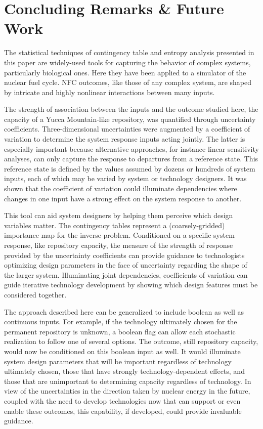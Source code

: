 \section{Concluding Remarks \& Future Work}
\label{cts_sec:conclusion}

The statistical techniques of contingency table and entropy analysis presented 
in this paper are widely-used tools for capturing the behavior of complex systems, 
particularly biological ones.  Here they have been applied to a simulator of the 
nuclear fuel cycle.  NFC outcomes, like those of any complex system, are shaped 
by intricate and highly nonlinear interactions between many inputs.

The strength of association between the inputs and the outcome studied here, the 
capacity of a Yucca Mountain-like repository, was quantified through uncertainty 
coefficients.  Three-dimensional uncertainties were augmented by a coefficient of 
variation to determine the system response inputs acting jointly.  The latter is 
especially important because alternative approaches, for instance linear sensitivity 
analyses, can only capture the response to departures from a reference state.  This 
reference state is defined by the values assumed by dozens or hundreds of system 
inputs, each of which may be varied by system or technology designers.  It was 
shown that the coefficient of variation could illuminate dependencies where changes 
in one input have a strong effect on the system response to another.  

This tool can aid system designers by helping them perceive which design variables 
matter.  The contingency tables represent a (coarsely-gridded) importance map for 
the inverse problem.  Conditioned on a specific system response, like repository 
capacity, the measure of the strength of response provided by the uncertainty coefficients 
can provide guidance to technologists optimizing design parameters in the face of uncertainty 
regarding the shape of the larger system.  Illuminating joint dependencies, coefficients of 
variation can guide iterative technology development by showing which design features must 
be considered together.

The approach described here can be generalized to include boolean as well as continuous inputs.  
For example, if the technology ultimately chosen for the permanent repository is unknown, 
a boolean flag can allow each stochastic realization to follow one of several options.  
The outcome, still repository capacity, would now be conditioned on this boolean input as well.  
It would illuminate system design parameters that will be important regardless of technology 
ultimately chosen, those that have strongly technology-dependent effects, and those that are 
unimportant to determining capacity regardless of technology.  In view of the uncertainties 
in the direction taken by nuclear energy in the future, coupled with the need to develop 
technologies now that can support or even enable these outcomes, this capability, if 
developed, could provide invaluable guidance.
